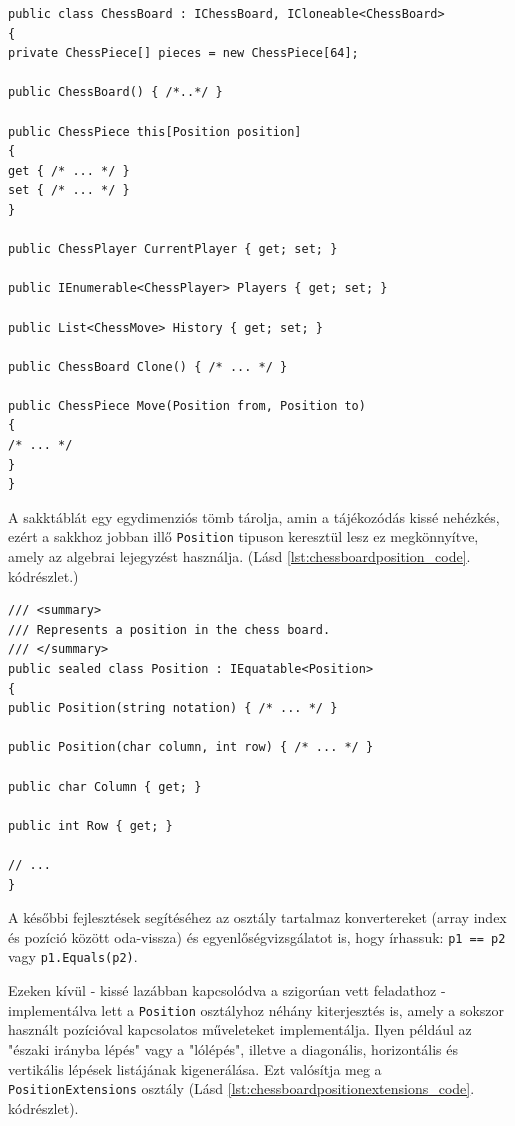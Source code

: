 \documentclass[twoside, a4paper, 12pt]{article}
\begin{document}
\begin{lstlisting}[caption=Sakktábla implementáció vázlat, label=lst:chessboard_code]
public class ChessBoard : IChessBoard, ICloneable<ChessBoard>
{
private ChessPiece[] pieces = new ChessPiece[64];

public ChessBoard()	{ /*..*/ }

public ChessPiece this[Position position]
{
get { /* ... */ }
set { /* ... */ }
}

public ChessPlayer CurrentPlayer { get; set; }

public IEnumerable<ChessPlayer> Players { get; set; }

public List<ChessMove> History { get; set; }

public ChessBoard Clone() { /* ... */ }

public ChessPiece Move(Position from, Position to)
{
/* ... */
}
}
\end{lstlisting}

A sakktáblát egy egydimenziós tömb tárolja, amin a tájékozódás kissé nehézkés, ezért a sakkhoz jobban illő \texttt{Position} tipuson keresztül lesz ez megkönnyítve, amely az algebrai lejegyzést használja. (Lásd \ref{lst:chessboardposition_code}. kódrészlet.)

\begin{lstlisting}[caption=Pozíciók a sakktáblán - Position osztály, label=lst:chessboardposition_code]
/// <summary>
/// Represents a position in the chess board.
/// </summary>
public sealed class Position : IEquatable<Position>
{
public Position(string notation) { /* ... */ }

public Position(char column, int row) { /* ... */ }

public char Column { get; }

public int Row { get; }

// ...
}
\end{lstlisting}

A későbbi fejlesztések segítéséhez az osztály tartalmaz konvertereket (array index és pozíció között oda-vissza) és egyenlőségvizsgálatot is, hogy írhassuk: \texttt{p1 == p2} vagy \texttt{p1.Equals(p2)}.

Ezeken kívül - kissé lazábban kapcsolódva a szigorúan vett feladathoz - implementálva lett a \texttt{Position} osztályhoz néhány kiterjesztés is, amely a sokszor használt pozícióval kapcsolatos műveleteket implementálja. Ilyen például az "északi irányba lépés" vagy a "lólépés", illetve a diagonális, horizontális és vertikális lépések listájának kigenerálása. Ezt valósítja meg a \texttt{PositionExtensions} osztály (Lásd \ref{lst:chessboardpositionextensions_code}. kódrészlet).
\end{document}
